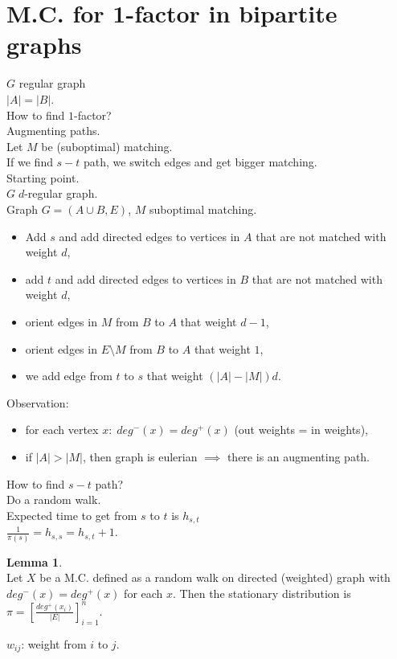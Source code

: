 \documentclass[a4paper, 12pt]{book}
\theoremstyle{definition}
\newtheorem{lemma}[counter]{Lemma}
\theoremstyle{remark}
\begin{document}
\section{M.C. for 1-factor in bipartite graphs}

$G$ regular graph \\
$|A| = |B|$. \\
How to find $1$-factor? \\
Augmenting paths. \\
Let $M$ be (suboptimal) matching. \\
If we find $s-t$ path, we switch edges and get bigger matching. \\
Starting point. \\
$G \; d$-regular graph. \\
Graph $G = (A \cup B, E)$, $M$ suboptimal matching.
\begin{itemize}
  \item Add $s$ and add directed edges to vertices in $A$ that are not matched with weight $d$,
  \item add $t$ and add directed edges to vertices in $B$ that are not matched with weight $d$,
  \item orient edges in $M$ from $B$ to $A$ that weight $d-1$,
  \item orient edges in $E \setminus M$ from $B$ to $A$ that weight $1$,
  \item we add edge from $t$ to $s$ that weight $(|A| - |M|) d$.
\end{itemize}
Observation:
\begin{itemize}
  \item for each vertex $x: \; deg^{-}(x) = deg^{+}(x)$ (out weights = in weights),
  \item if $|A| > |M|$, then graph is eulerian $\implies$ there is an augmenting path.
\end{itemize}
How to find $s-t$ path? \\
Do a random walk. \\
Expected time to get from $s$ to $t$ is $h_{s,t}$ \\
$\frac{1}{\pi(s)} = h_{s,s} = h_{s,t} + 1$.
\begin{lemma} \text{} \\
  Let $X$ be a M.C. defined as a random walk on directed (weighted) graph with $deg^{-}(x) = deg^{+}(x)$ for each $x$.
  Then the stationary distribution is $\pi = \left[\frac{deg^{+}(x_i)}{|E|}\right]_{i=1}^n$.
\end{lemma}
$w_{ij}$: weight from $i$ to $j$.
\end{document}
